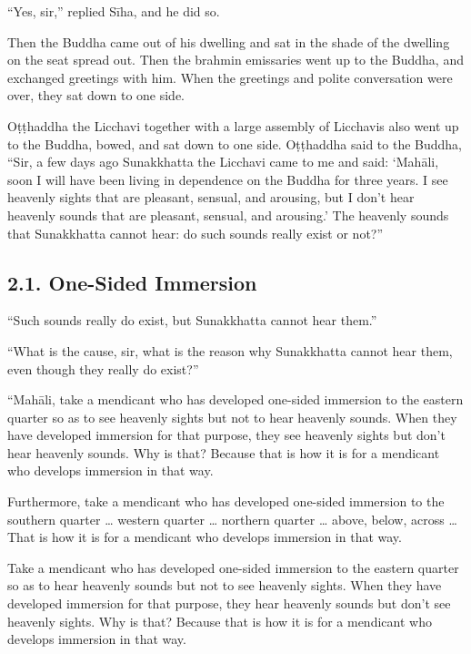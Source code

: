 \documentclass[12pt,openany]{book}%
\begin{document}
“Yes, sir,” replied \textsanskrit{Sīha}, and he did so. 

Then the Buddha came out of his dwelling and sat in the shade of the dwelling on the seat spread out. Then the brahmin emissaries went up to the Buddha, and exchanged greetings with him. When the greetings and polite conversation were over, they sat down to one side. 

\textsanskrit{Oṭṭhaddha} the Licchavi together with a large assembly of Licchavis also went up to the Buddha, bowed, and sat down to one side. \textsanskrit{Oṭṭhaddha} said to the Buddha, “Sir, a few days ago Sunakkhatta the Licchavi came to me and said: ‘\textsanskrit{Mahāli}, soon I will have been living in dependence on the Buddha for three years. I see heavenly sights that are pleasant, sensual, and arousing, but I don’t hear heavenly sounds that are pleasant, sensual, and arousing.’ The heavenly sounds that Sunakkhatta cannot hear: do such sounds really exist or not?” 

\subsection*{2.1. One-Sided Immersion }

“Such sounds really do exist, but Sunakkhatta cannot hear them.” 

“What is the cause, sir, what is the reason why Sunakkhatta cannot hear them, even though they really do exist?” 

“\textsanskrit{Mahāli}, take a mendicant who has developed one-sided immersion to the eastern quarter so as to see heavenly sights but not to hear heavenly sounds. When they have developed immersion for that purpose, they see heavenly sights but don’t hear heavenly sounds. Why is that? Because that is how it is for a mendicant who develops immersion in that way. 

Furthermore, take a mendicant who has developed one-sided immersion to the southern quarter … western quarter … northern quarter … above, below, across … That is how it is for a mendicant who develops immersion in that way. 

Take a mendicant who has developed one-sided immersion to the eastern quarter so as to hear heavenly sounds but not to see heavenly sights. When they have developed immersion for that purpose, they hear heavenly sounds but don’t see heavenly sights. Why is that? Because that is how it is for a mendicant who develops immersion in that way. 
\end{document}
